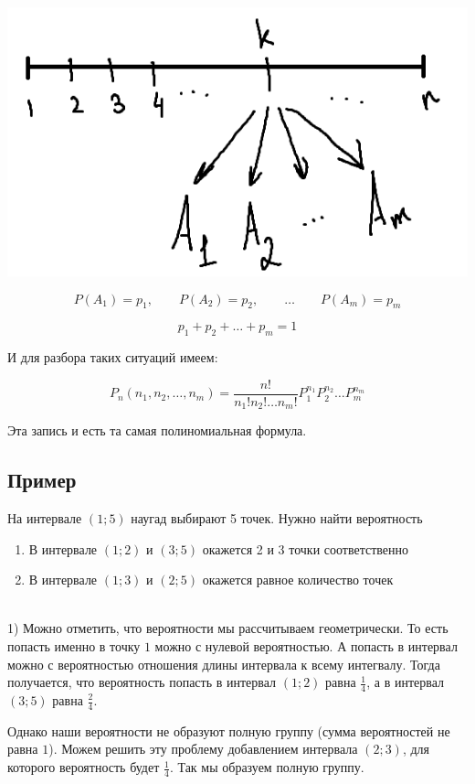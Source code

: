 \documentclass{article}
\begin{document}
\begin{center}
    \includegraphics[scale=0.5]{4.png}
\end{center}

$$P(A_1) = p_1,\qquad P(A_2) = p_2, \qquad \ldots \qquad P(A_m) = p_m$$

$$ p_1 + p_2 + \ldots + p_m = 1$$

И для разбора таких ситуаций имеем:

$$P_n(n_1, n_2, \ldots, n_m) = \frac{n!}{n_1!n_2!\ldots n_m!} P_1^{n_1} P_2^{n_2} \ldots P_m^{n_m} $$

Эта запись и есть та самая полиномиальная формула.

\subsection{Пример}

На интервале $(1; 5)$ наугад выбирают 5 точек. Нужно найти вероятность

\begin{enumerate}
\item В интервале $(1; 2)$ и $(3; 5)$ окажется 2 и 3 точки соответственно
\item В интервале $(1; 3)$ и $(2; 5)$ окажется равное количество точек
\end{enumerate}
\\

1) Можно отметить, что вероятности мы рассчитываем геометрически. То есть попасть именно в точку $1$ можно с нулевой вероятностью. А попасть в интервал можно с вероятностью отношения длины интервала к всему интегвалу. Тогда получается, что вероятность попасть в интервал $(1; 2)$ равна $\frac{1}{4}$, а в интервал $(3; 5)$ равна $\frac{2}{4}$.

Однако наши вероятности не образуют полную группу (сумма вероятностей не равна $1$). Можем решить эту проблему добавлением интервала $(2; 3)$, для которого вероятность будет $\frac{1}{4}$. Так мы образуем полную группу.
\end{document}
